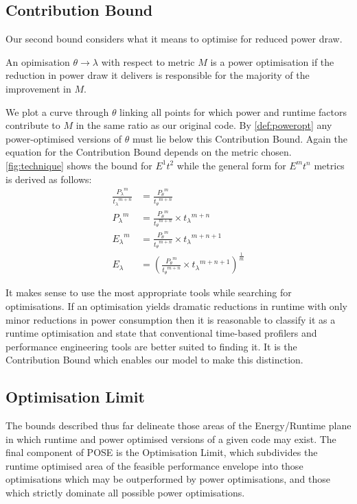 \subsection{Contribution Bound}
Our second bound considers what it means to optimise for reduced power draw.

\begin{definition}
An opimisation $\theta \to \lambda$ with respect to metric $M$ is a power optimisation if the reduction in power draw it delivers is responsible for the majority of the improvement in $M$.
\label{def:poweropt}
\end{definition}

We plot a curve through $\theta$ linking all points for which power and runtime factors contribute to $M$ in the same ratio as our original code.
By \autoref{def:poweropt} any power-optimised versions of $\theta$ must lie below this Contribution Bound.
Again the equation for the Contribution Bound depends on the metric chosen. 
\autoref{fig:technique} shows the bound for $E^1t^2$ while the general form for $E^mt^n$ metrics is derived as follows:
\begin{align}
\frac{{P_{\lambda}}^m}{{t_{\lambda}}^{m+n}} &= \frac{{P_{\theta}}^m}{{t_{\theta}}^{m+n}} \nonumber \\
 {P_{\lambda}}^m &= \frac{{P_{\theta}}^m}{{t_{\theta}}^{m+n}} \times {t_\lambda}^{m+n} \nonumber \\ 
 {E_{\lambda}}^m &= \frac{{P_{\theta}}^m}{{t_{\theta}}^{m+n}} \times {t_\lambda}^{m+n+1} \nonumber \\ 
  E_{\lambda} &= (\frac{{P_{\theta}}^m}{{t_{\theta}}^{m+n}} \times {t_\lambda}^{m+n+1})^{\frac{1}{m}} 
\end{align}

It makes sense to use the most appropriate tools while searching for optimisations.
If an optimisation yields dramatic reductions in runtime with only minor reductions in power consumption then it is reasonable to classify it as a runtime optimisation and state that conventional time-based profilers and performance engineering tools are better suited to finding it.
It is the Contribution Bound which enables our model to make this distinction.
\subsection{Optimisation Limit}
The bounds described thus far delineate those areas of the Energy/Runtime plane in which runtime and power optimised versions of a given code may exist.
The final component of POSE is the Optimisation Limit, which subdivides the runtime optimised area of the feasible performance envelope into those optimisations which may be outperformed by power optimisations, and those which strictly dominate all possible power optimisations.

